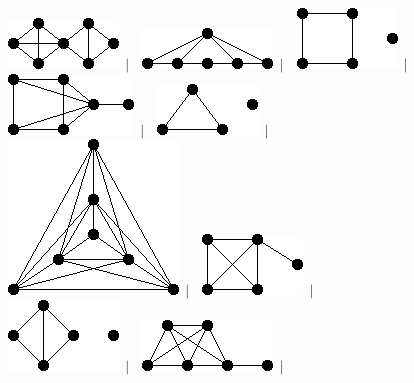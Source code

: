 \documentclass[11pt,paper=b5,footinclude,headinclude]{scrbook} %
\newtheorem{ex}{Vaja\hypertarget{sol:\theex}}[chapter]
\begin{document}
\begin{ex}
\begin{figure}
\includegraphics[scale=0.5]{smallGraphs/g_co-X99.png}$\,\mid\,$\
\includegraphics[scale=0.5]{smallGraphs/g_co-antenna.png}$\,\mid\,$\
\includegraphics[scale=0.5]{smallGraphs/g_co-butterfly.png}$\,\mid\,$\
\includegraphics[scale=0.5]{smallGraphs/g_co-butterflyUK1.png}$\,\mid\,$\
\includegraphics[scale=0.5]{smallGraphs/g_co-claw.png}$\,\mid\,$\
\includegraphics[scale=0.5]{smallGraphs/g_co-clawU3K1.png}$\,\mid\,$\
\includegraphics[scale=0.5]{smallGraphs/g_co-clawUK1.png}$\,\mid\,$\
\includegraphics[scale=0.5]{smallGraphs/g_co-cricket.png}$\,\mid\,$\
\includegraphics[scale=0.5]{smallGraphs/g_co-cross.png}$\,\mid\,$\

\end{figure}
\end{ex}
\end{document}
